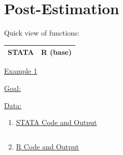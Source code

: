 \documentclass[landscape]{article}
\begin{document}
\section{Post-Estimation}
Quick view of functions:\\
\begin{tabular}{c|l}
STATA & R (base) \\
\hline

\end{tabular}


\noindent \underline{Example 1}

\underline{Goal:}

\underline{Data:}
\begin{enumerate}[]
\item \underline{STATA Code and Output}
{\scriptsize
\begin{verbatim}

\end{verbatim}
}
\item \underline{R Code and Output}
{\scriptsize

}
\end{enumerate}
\end{document}
